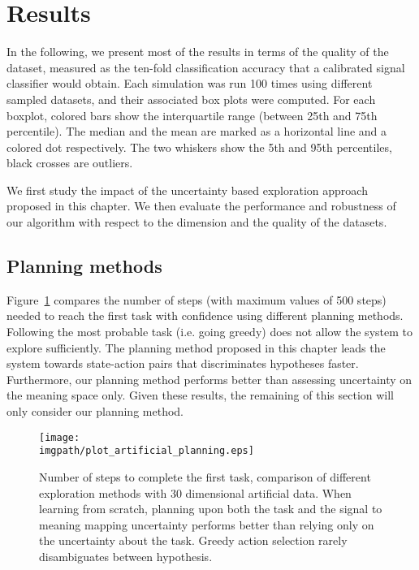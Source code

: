 \section{Results}
\label{chapter:planning:results}

In the following, we present most of the results in terms of the quality of the dataset, measured as the ten-fold classification accuracy that a calibrated signal classifier would obtain. Each simulation was run 100 times using different sampled datasets, and their associated box plots were computed. For each boxplot, colored bars show the interquartile range (between 25th and 75th percentile). The median and the mean are marked as a horizontal line and a colored dot respectively. The two whiskers show the 5th and 95th percentiles, black crosses are outliers. 

We first study the impact of the uncertainty based exploration approach proposed in this chapter. We then evaluate the performance and robustness of our algorithm with respect to the dimension and the quality of the datasets.

\subsection{Planning methods}

Figure~\ref{fig:artificialplanning} compares the number of steps (with maximum values of 500 steps) needed to reach the first task with confidence using different planning methods. Following the most probable task (i.e. going greedy) does not allow the system to explore sufficiently. The planning method proposed in this chapter leads the system towards state-action pairs that discriminates hypotheses faster. Furthermore, our planning method performs better than assessing uncertainty on the meaning space only. Given these results, the remaining of this section will only consider our planning method.

\begin{figure}[!htbp]
  \centering
      \texttt{[image: \\imgpath/plot\_artificial\_planning.eps]}
      \caption{Number of steps to complete the first task, comparison of different exploration methods with 30 dimensional artificial data. When learning from scratch, planning upon both the task and the signal to meaning mapping uncertainty performs better than relying only on the uncertainty about the task. Greedy action selection rarely disambiguates between hypothesis.}
    \label{fig:artificialplanning}
\end{figure}

